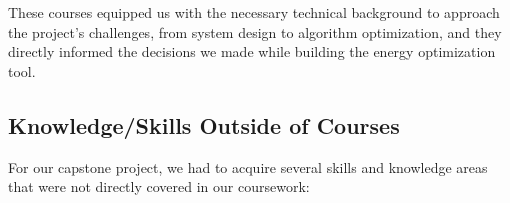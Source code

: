 \documentclass{article}
\begin{document}
These courses equipped us with the necessary technical background to approach the project’s 
challenges, from system design to algorithm optimization, and they directly informed the decisions 
we made while building the energy optimization tool.

\subsection{Knowledge/Skills Outside of Courses}


For our capstone project, we had to acquire several skills and knowledge areas that were not directly 
covered in our coursework:
\end{document}
